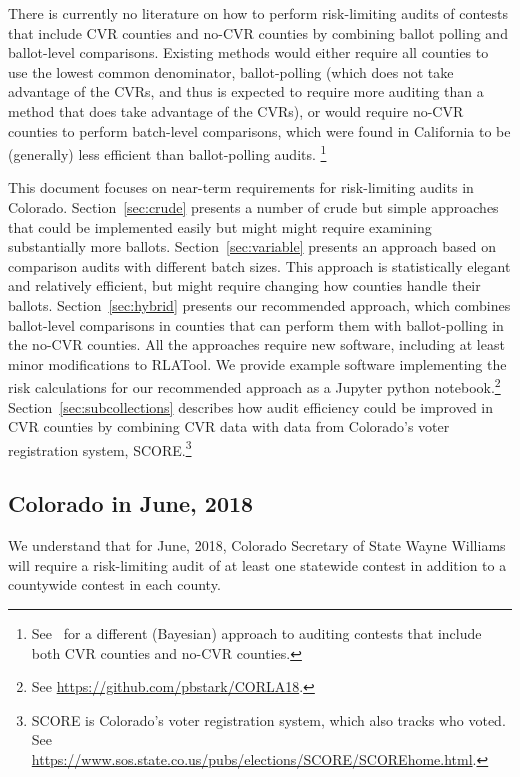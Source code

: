\documentclass[12pt]{article}
\begin{document}
There is currently no literature on how to perform risk-limiting audits 
of contests that include CVR counties and no-CVR counties by combining
ballot polling and ballot-level comparisons.
Existing methods would either require all counties to use the lowest
common denominator, ballot-polling (which does not take advantage of the CVRs,
and thus is expected to require more auditing than a method that does take
advantage of the CVRs), or would
require no-CVR counties to perform batch-level comparisons, which were found in
California to be (generally) less efficient than ballot-polling audits.%
\footnote{%
  See~\cite{Rivest-2018-bayesian-tabulation-audits}
  for a different (Bayesian) approach to auditing contests that include both CVR counties
  and no-CVR counties.
  }

This document focuses on near-term requirements for risk-limiting audits in Colorado.
Section~\ref{sec:crude} presents a number of crude but simple approaches 
that could be implemented easily
but might might require examining substantially more ballots.
Section~\ref{sec:variable}
presents an approach based on comparison audits with different batch sizes.
This approach is statistically elegant and relatively efficient, but might require changing how counties
handle their ballots.
Section~\ref{sec:hybrid} presents our recommended approach, which combines ballot-level
comparisons in counties that can perform them with ballot-polling in the no-CVR counties.
All the approaches require new software, including at least minor modifications to RLATool.
We provide example software implementing the risk calculations for
our recommended approach as a Jupyter python notebook.\footnote{%
 See \url{https://github.com/pbstark/CORLA18}.
}
Section~\ref{sec:subcollections}
describes how audit efficiency could be improved in CVR counties by combining CVR
data with data from Colorado's voter registration system, SCORE.\footnote{%
  SCORE is Colorado's voter registration system, which also tracks who voted.
  See \url{https://www.sos.state.co.us/pubs/elections/SCORE/SCOREhome.html}.
} 

\subsection{Colorado in June, 2018}
We understand that for June, 2018, Colorado Secretary of State Wayne Williams will require
a risk-limiting audit of at least one statewide contest in addition
to a countywide contest in each county.
\end{document}
